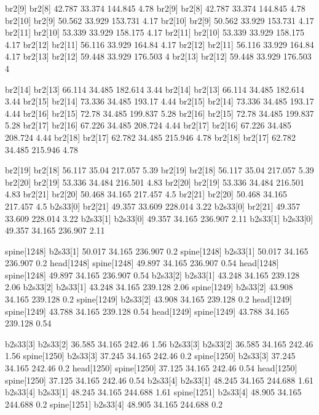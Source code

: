 br2[9]    br2[8]    42.787    33.374    144.845    4.78
br2[9]    br2[8]    42.787    33.374    144.845    4.78
br2[10]    br2[9]    50.562    33.929    153.731    4.17
br2[10]    br2[9]    50.562    33.929    153.731    4.17
br2[11]    br2[10]    53.339    33.929    158.175    4.17
br2[11]    br2[10]    53.339    33.929    158.175    4.17
br2[12]    br2[11]    56.116    33.929    164.84    4.17
br2[12]    br2[11]    56.116    33.929    164.84    4.17
br2[13]    br2[12]    59.448    33.929    176.503    4
br2[13]    br2[12]    59.448    33.929    176.503    4


br2[14]    br2[13]    66.114    34.485    182.614    3.44
br2[14]    br2[13]    66.114    34.485    182.614    3.44
br2[15]    br2[14]    73.336    34.485    193.17    4.44
br2[15]    br2[14]    73.336    34.485    193.17    4.44
br2[16]    br2[15]    72.78    34.485    199.837    5.28
br2[16]    br2[15]    72.78    34.485    199.837    5.28
br2[17]    br2[16]    67.226    34.485    208.724    4.44
br2[17]    br2[16]    67.226    34.485    208.724    4.44
br2[18]    br2[17]    62.782    34.485    215.946    4.78
br2[18]    br2[17]    62.782    34.485    215.946    4.78


br2[19]    br2[18]    56.117    35.04    217.057    5.39
br2[19]    br2[18]    56.117    35.04    217.057    5.39
br2[20]    br2[19]    53.336    34.484    216.501    4.83
br2[20]    br2[19]    53.336    34.484    216.501    4.83
br2[21]    br2[20]    50.468    34.165    217.457    4.5
br2[21]    br2[20]    50.468    34.165    217.457    4.5
b2s33[0]    br2[21]    49.357    33.609    228.014    3.22
b2s33[0]    br2[21]    49.357    33.609    228.014    3.22
b2s33[1]    b2s33[0]    49.357    34.165    236.907    2.11
b2s33[1]    b2s33[0]    49.357    34.165    236.907    2.11


spine[1248]    b2s33[1]    50.017    34.165    236.907    0.2
spine[1248]    b2s33[1]    50.017    34.165    236.907    0.2
head[1248]    spine[1248]    49.897    34.165    236.907    0.54
head[1248]    spine[1248]    49.897    34.165    236.907    0.54
b2s33[2]    b2s33[1]    43.248    34.165    239.128    2.06
b2s33[2]    b2s33[1]    43.248    34.165    239.128    2.06
spine[1249]    b2s33[2]    43.908    34.165    239.128    0.2
spine[1249]    b2s33[2]    43.908    34.165    239.128    0.2
head[1249]    spine[1249]    43.788    34.165    239.128    0.54
head[1249]    spine[1249]    43.788    34.165    239.128    0.54


b2s33[3]    b2s33[2]    36.585    34.165    242.46    1.56
b2s33[3]    b2s33[2]    36.585    34.165    242.46    1.56
spine[1250]    b2s33[3]    37.245    34.165    242.46    0.2
spine[1250]    b2s33[3]    37.245    34.165    242.46    0.2
head[1250]    spine[1250]    37.125    34.165    242.46    0.54
head[1250]    spine[1250]    37.125    34.165    242.46    0.54
b2s33[4]    b2s33[1]    48.245    34.165    244.688    1.61
b2s33[4]    b2s33[1]    48.245    34.165    244.688    1.61
spine[1251]    b2s33[4]    48.905    34.165    244.688    0.2
spine[1251]    b2s33[4]    48.905    34.165    244.688    0.2



